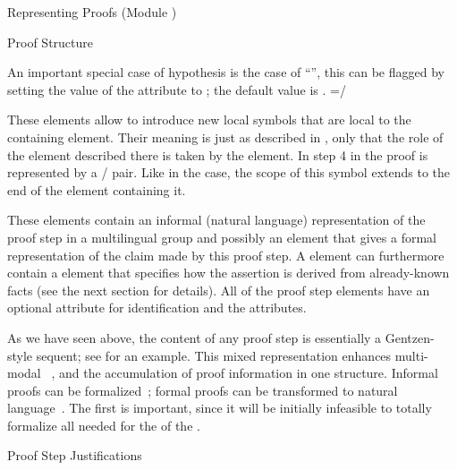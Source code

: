 \begin{tchapter}[id=proofs,short=Representing Proofs]{Representing Proofs (Module {})}
\begin{tsection}[id=proof-text]{Proof Structure}
\begin{description}
  An important special case of hypothesis is the case of
  ``{}'', this can be flagged by setting the value of the
  attribute {} to {};
  the default value is {}.
  =\hbox{/}\item[\box0] These elements allow
  to introduce new local symbols that are local to the containing {}
  element.  Their meaning is just as described in {}, only that the
  role of the {} element described there is taken by the
  {} element. In {} step 4 in the proof
  is represented by a {}/{} pair. Like in the
  {} case, the scope of this symbol extends to the end of the
  {} element containing it.
\end{description}

These elements contain an informal (natural language) representation of the proof step in
a multilingual {} group and possibly an
{} element that gives a formal representation of the claim made by this proof
step. A {} element can furthermore contain a {} element
that specifies how the assertion is derived from already-known facts (see the next section
for details). All of the proof step elements have an optional
{} attribute for identification and the {\css} attributes.

As we have seen above, the content of any proof step is essentially a Gentzen-style sequent; see
{} for an example. This mixed representation enhances multi-modal
{}~\cite{Fiedler:tape97}, and the accumulation of proof
information in one structure. Informal proofs can be formalized~\cite{Baur:susmt99};
formal proofs can be transformed to natural language~\cite{HuangFiedler:pmfp96}. The first
is important, since it will be initially infeasible to totally formalize all
{} needed for the {} of the
{}.
\end{tsection}

\begin{tsection}[id=proofs:justifications]{Proof Step Justifications}
  

\end{tsection}
\end{tchapter}

